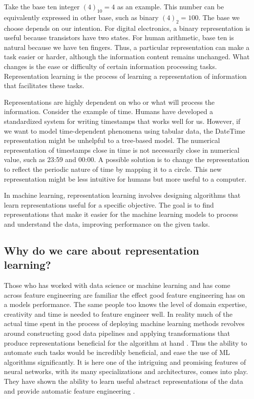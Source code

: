 \documentclass[../../thesis.tex]{subfiles}
\begin{document}
Take the base ten integer $(4)_{10}= 4$ as an example. This number can be equivalently expressed in other base, such as binary $(4)_{2}=100$. The base we choose depends on our intention. For digital electronics, a binary representation is useful because transistors have two states. For human arithmetic, base ten is natural because we have ten fingers. Thus, a particular representation can make a task easier or harder, although the information content remains unchanged. What changes is the ease or difficulty of certain information processing tasks. Representation learning is the process of learning a representation of information that facilitates these tasks.\newline

Representations are highly dependent on who or what will process the information. Consider the example of time. Humans have developed a standardized system for writing timestamps that works well for us. However, if we want to model time-dependent phenomena using tabular data, the DateTime representation might be unhelpful to a tree-based model. The numerical representation of timestamps close in time is not necessarily close in numerical value, such as 23:59 and 00:00. A possible solution is to change the representation to reflect the periodic nature of time by mapping it to a circle. This new representation might be less intuitive for humans but more useful to a computer.\newline

In machine learning, representation learning involves designing algorithms that learn representations useful for a specific objective. The goal is to find representations that make it easier for the machine learning models to process and understand the data, improving performance on the given tasks.

\subsection{Why do we care about representation learning?}
Those who has worked with data science or machine learning and has come across feature engineering are familiar the effect good feature engineering has on a models performance. The same people too knows the level of domain expertise, creativity and time is needed to feature engineer well. In reality much of the actual time spent in the process of deploying machine learning methods revolves around constructing good data pipelines and applying transformations that produce representations beneficial for the algorithm at hand \cite{Rep-rev-persp}. Thus the ability to automate such tasks would be incredibly beneficial, and ease the use of ML algorithms significantly. It is here one of the intriguing and promising features of neural networks, with its many specializations and architectures, comes into play. They have shown the ability to learn useful abstract representations of the data and provide automatic feature engineering \cite{Rep-rev-persp}. 
\end{document}
